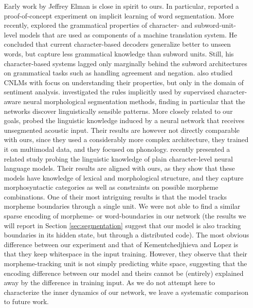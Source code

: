 Early work by Jeffrey Elman is close in spirit to ours. In particular,
 reported a proof-of-concept experiment on
implicit learning of word segmentation. More recently,
 explored the grammatical properties of
character- and subword-unit-level models that are used as components
of a machine translation system. He concluded that current
character-based decoders generalize better to unseen words, but
capture less grammatical knowledge than subword units. Still, his
character-based systems lagged only marginally behind the subword
architectures on grammatical tasks such as handling agreement and
negation.  also studied CNLMs
with focus on understanding their properties, but only in the domain
of sentiment analysis.  investigated the
rules implicitly used by supervised character-aware neural
morphological segmentation methods, finding in particular that the
networks discover linguistically sensible patterns. More closely
related to our goals,  probed the
linguistic knowledge induced by a neural network that receives
unsegmented acoustic input. Their results are however not directly
comparable with ours, since they used a considerably more complex
architecture, they trained it on multimodal data, and they focused on
phonology.  recently presented a
related study probing the linguistic knowledge of plain
character-level neural language models. Their results are aligned with
ours, as they show that these models have knowledge of lexical and
morphological structure, and they capture morphosyntactic categories
as well as constraints on possible morpheme combinations. One of their
most intriguing results is that the model tracks morpheme boundaries
through a single unit. We were not able to find a similar sparse
encoding of morpheme- or word-boundaries in our network (the results
we will report in Section \ref{sec:segmentation} suggest that our
model is also tracking boundaries in its hidden state, but through a
distributed code). The most obvious difference between our experiment
and that of Kementchedjhieva and Lopez is that they keep whitespace in
the input training.  However, they observe that their
morpheme-tracking unit is not simply predicting white space,
suggesting that the encoding difference between our model and theirs
cannot be (entirely) explained away by the difference in training
input. As we do not attempt here to characterize the inner dynamics of
our network, we leave a systematic comparison to future work.


